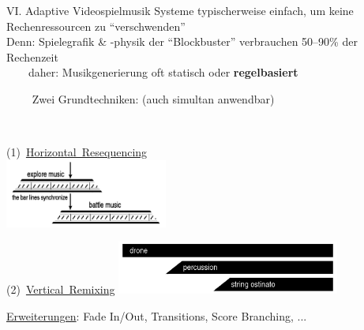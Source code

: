 \begin{frame}{VI. \dimSixTitle}{Adaptive Videospielmusik}
	Systeme typischerweise einfach, um keine Rechenressourcen zu \enquote{verschwenden}\\
	Denn: Spielegrafik \& -physik der \enquote{Blockbuster} verbrauchen 50--90\% der Rechenzeit\\
	\medskip
	~~~\conclude~daher: Musikgenerierung oft statisch oder \textbf{regelbasiert}
	\medskip
	
	~~~~ Zwei Grundtechniken: {\footnotesize(auch simultan anwendbar)}
	\medskip
	
	~~\parbox[t]{.425\textwidth}{
		\mbox{(1) \underline{Horizontal Resequencing}}\\
		\includegraphics[width=0.4\textwidth]{img/GameMusic_SyncedScores.png}
	}
	\parbox[t]{.52\textwidth}{
		\mbox{(2) \underline{Vertical Remixing}}
			\includegraphics[width=0.55\textwidth]{img/GameMusic_VerticalRemixing.png}
	}
	
	\medskip
	\hfill\underline{Erweiterungen}: Fade In/Out, Transitions, Score Branching, ...
	
\end{frame}

